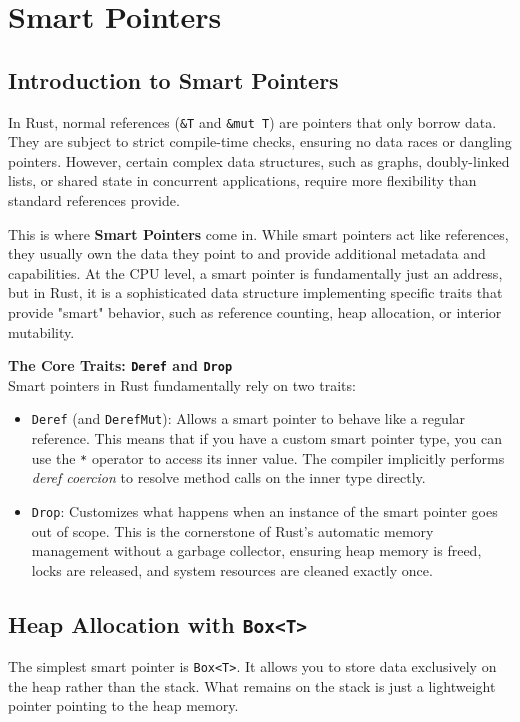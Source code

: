 \chapter{Smart Pointers}

\section{Introduction to Smart Pointers}
In Rust, normal references (\texttt{\&T} and \texttt{\&mut T}) are pointers that only borrow data. They are subject to strict compile-time checks, ensuring no data races or dangling pointers. However, certain complex data structures, such as graphs, doubly-linked lists, or shared state in concurrent applications, require more flexibility than standard references provide. 

This is where \textbf{Smart Pointers} come in. While smart pointers act like references, they usually own the data they point to and provide additional metadata and capabilities. At the CPU level, a smart pointer is fundamentally just an address, but in Rust, it is a sophisticated data structure implementing specific traits that provide "smart" behavior, such as reference counting, heap allocation, or interior mutability.

\begin{insightbox}
\textbf{The Core Traits: \texttt{Deref} and \texttt{Drop}} \\
Smart pointers in Rust fundamentally rely on two traits:
\begin{itemize}
    \item \texttt{Deref} (and \texttt{DerefMut}): Allows a smart pointer to behave like a regular reference. This means that if you have a custom smart pointer type, you can use the \texttt{*} operator to access its inner value. The compiler implicitly performs \textit{deref coercion} to resolve method calls on the inner type directly.
    \item \texttt{Drop}: Customizes what happens when an instance of the smart pointer goes out of scope. This is the cornerstone of Rust's automatic memory management without a garbage collector, ensuring heap memory is freed, locks are released, and system resources are cleaned exactly once.
\end{itemize}
\end{insightbox}

\section{Heap Allocation with \texttt{Box<T>}}
The simplest smart pointer is \texttt{Box<T>}. It allows you to store data exclusively on the heap rather than the stack. What remains on the stack is just a lightweight pointer pointing to the heap memory.

